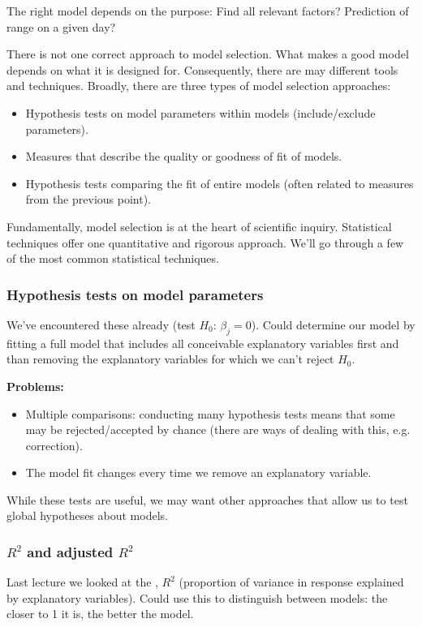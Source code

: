 The right model depends on the purpose: Find all relevant factors? Prediction of range on a given day?

There is not one correct approach to model selection. What makes a good model depends on what it is designed for. Consequently, there are may different tools and techniques. Broadly, there are three types of model selection approaches:
\begin{itemize}
	\item Hypothesis tests on model parameters within models (include/exclude parameters).
	\item Measures that describe the quality or goodness of fit of models.
	\item Hypothesis tests comparing the fit of entire models (often related to measures from the previous point).
\end{itemize}
Fundamentally, model selection is at the heart of scientific inquiry. Statistical techniques offer one quantitative and rigorous approach. We'll go through a few of the most common statistical techniques.

\subsubsection{Hypothesis tests on model parameters}

We've encountered these already (test $H_0$: $\beta_j=0$). Could determine our model by fitting a full model that includes all conceivable explanatory variables first and than removing the explanatory variables for which we can't reject $H_0$.

\textbf{Problems:}
\begin{itemize}
	\item Multiple comparisons: conducting many hypothesis tests means that some may be rejected/accepted by chance (there are ways of dealing with this, e.g.  correction).
	\item The model fit changes every time we remove an explanatory variable.
\end{itemize} 

While these tests are useful, we may want other approaches that allow us to test global hypotheses about models.

\subsubsection{$R^2$ and adjusted $R^2$}

Last lecture we looked at the , $R^2$ (proportion of variance in response explained by explanatory variables). Could use this to distinguish between models: the closer to 1 it is, the better the model.

